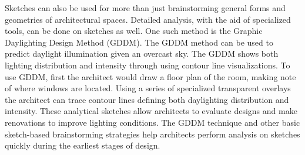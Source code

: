 
  Sketches can also be used for more than just brainstorming general forms and geometries of architectural spaces. 
  Detailed analysis, with the aid of specialized tools, can be done on sketches as well.
  One such method is the Graphic Daylighting Design Method (GDDM)\cite{millet1980graphic,moore}.
  The GDDM method can be used to predict daylight illumination given an overcast sky.
  The GDDM shows both lighting distribution and intensity through using contour line visualizations.
  To use GDDM, first the architect would draw a floor plan of the room, making note of where windows are located.
  Using a series of specialized transparent overlays the architect can trace contour lines defining both daylighting distribution and intensity.
  These analytical sketches allow architects to evaluate designs and make renovations to improve lighting conditions.
  The GDDM technique and other basic sketch-based brainstorming strategies help architects perform analysis on sketches quickly during the earliest stages of design.



